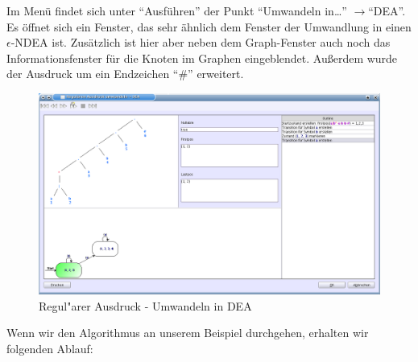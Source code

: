 Im Menü findet sich unter "`Ausführen"' der Punkt "`Umwandeln in\ldots"' $\rightarrow$"`DEA"'. Es öffnet sich ein Fenster, das sehr ähnlich dem Fenster der Umwandlung in einen $\epsilon$-NDEA ist. Zusätzlich ist hier aber neben dem Graph-Fenster auch noch das Informationsfenster für die Knoten im Graphen eingeblendet. Außerdem wurde der Ausdruck um ein Endzeichen "`\#"' erweitert.

\begin{figure}[h]
\begin{center}
\includegraphics[width=12cm]{../images/regex_to_dfa.png}
\caption{Regul"arer Ausdruck - Umwandeln in DEA}
\end{center}
\end{figure}

Wenn wir den Algorithmus an unserem Beispiel durchgehen, erhalten wir folgenden Ablauf:

